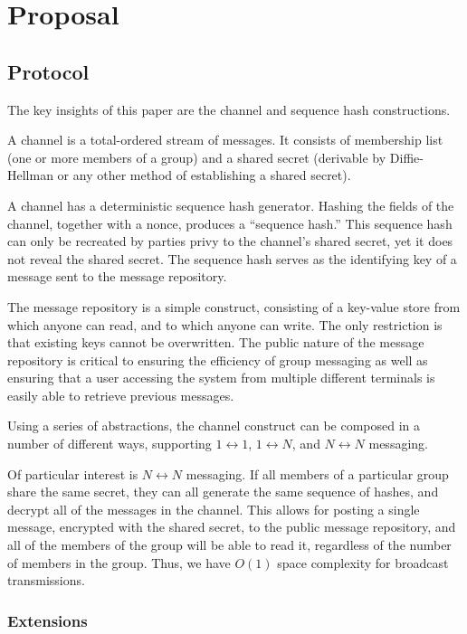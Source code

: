 \chapter{Proposal}\label{Proposal}

\section{Protocol}\label{protocol}

The key insights of this paper are the channel and sequence hash constructions.

A channel is a total-ordered stream of messages. It consists of membership list (one or more members of a group) and a shared secret (derivable by Diffie-Hellman or any other method of establishing a shared secret). \parencite{diffie_new_1976}

A channel has a deterministic sequence hash generator. Hashing the fields of the channel, together with a nonce, produces a ``sequence hash.'' This sequence hash can only be recreated by parties privy to the channel's shared secret, yet it does not reveal the shared secret. The sequence hash serves as the identifying key of a message sent to the message repository.

The message repository is a simple construct, consisting of a key-value store from which anyone can read, and to which anyone can write. The only restriction is that existing keys cannot be overwritten. The public nature of the message repository is critical to ensuring the efficiency of group messaging as well as ensuring that a user accessing the system from multiple different terminals is easily able to retrieve previous messages.

Using a series of abstractions, the channel construct can be composed in a number of different ways, supporting $1 \leftrightarrow 1$, $1 \leftrightarrow N$, and $N \leftrightarrow N$ messaging.

Of particular interest is $N \leftrightarrow N$ messaging. If all members of a particular group share the same secret, they can all generate the same sequence of hashes, and decrypt all of the messages in the channel. This allows for posting a single message, encrypted with the shared secret, to the public message repository, and all of the members of the group will be able to read it, regardless of the number of members in the group. Thus, we have $O(1)$ space complexity for broadcast transmissions.

\subsection{Extensions}\label{extensions}

